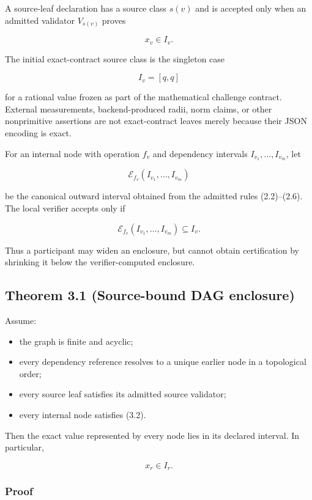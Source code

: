 A source-leaf declaration has a source class \(s(v)\) and is accepted only when an admitted validator \(V_{s(v)}\) proves

\[
\boxed{x_v\in I_v.}
\tag{3.1}
\]

The initial exact-contract source class is the singleton case

\[
I_v=[q,q]
\]

for a rational value frozen as part of the mathematical challenge contract. External measurements, backend-produced radii, norm claims, or other nonprimitive assertions are not exact-contract leaves merely because their JSON encoding is exact.

For an internal node with operation \(f_v\) and dependency intervals \(I_{v_1},\ldots,I_{v_m}\), let

\[
\mathcal E_{f_v}(I_{v_1},\ldots,I_{v_m})
\]

be the canonical outward interval obtained from the admitted rules (2.2)--(2.6). The local verifier accepts only if

\[
\boxed{
\mathcal E_{f_v}(I_{v_1},\ldots,I_{v_m})\subseteq I_v.
}
\tag{3.2}
\]

Thus a participant may widen an enclosure, but cannot obtain certification by shrinking it below the verifier-computed enclosure.

\hypertarget{theorem-3.1-source-bound-dag-enclosure}{%
\subsection{Theorem 3.1 (Source-bound DAG enclosure)}\label{theorem-3.1-source-bound-dag-enclosure}}

Assume:

\begin{itemize}
\tightlist
\item
  the graph is finite and acyclic;
\item
  every dependency reference resolves to a unique earlier node in a topological order;
\item
  every source leaf satisfies its admitted source validator;
\item
  every internal node satisfies (3.2).
\end{itemize}

Then the exact value represented by every node lies in its declared interval. In particular,

\[
\boxed{x_r\in I_r.}
\tag{3.3}
\]

\hypertarget{proof}{%
\subsubsection{Proof}\label{proof}}

